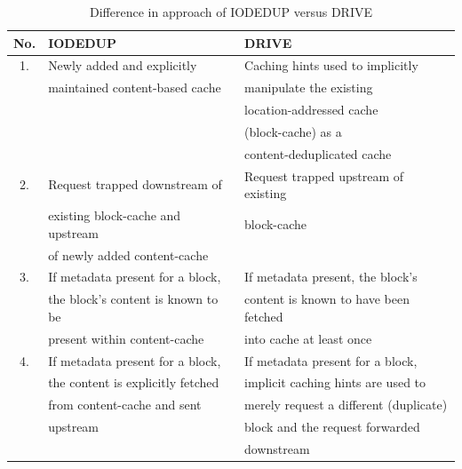 \begin{table}[h]
\caption{Difference in approach of IODEDUP versus DRIVE}
\label{tab:drive-novelty}
\centering
\begin{tabular}{|c|l|l|} \hline
\textbf{No.} & \textbf{IODEDUP} & \textbf{DRIVE} \\ \hline
1. & Newly added and explicitly        & Caching hints used to implicitly \\
   & maintained content-based cache    & manipulate the existing          \\
   &                                   & location-addressed cache         \\ 
   &                                   & (block-cache) as a \\
   &                                   & content-deduplicated cache \\ \hline
2. & Request trapped downstream of     & Request trapped upstream of existing\\ 
   & existing block-cache and upstream & block-cache \\
   & of newly added content-cache      & \\ \hline
3. & If metadata present for a block,  & If metadata present, the block's \\
   & the block's content is known to be& content is known to have been fetched \\
   & present within content-cache      & into cache at least once \\ \hline
4. & If metadata present for a block,  & If metadata present for a block, \\
   & the content is explicitly fetched & implicit caching hints are used to \\
   & from content-cache and sent       & merely request a different (duplicate) \\
   & upstream                          & block and the request forwarded \\
   &                                   & downstream \\ \hline
\end{tabular}
\end{table}

